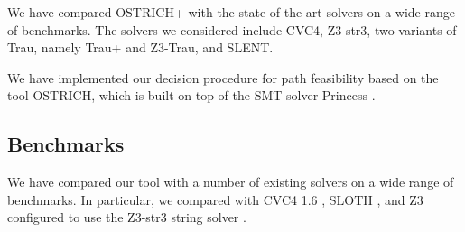 
We have compared OSTRICH+ with the state-of-the-art solvers on a wide range of benchmarks. The solvers we considered include CVC4, Z3-str3, two variants of Trau, namely Trau+ and Z3-Trau, and SLENT. 

We have implemented our decision procedure for path feasibility based on the tool OSTRICH, which is built on top of the SMT solver Princess \cite{}. 
%


\subsection{Benchmarks}
 
We have compared our tool with a number of existing solvers on a wide range of benchmarks. In
particular, we compared  with CVC4 1.6 \cite{}, SLOTH \cite{},
and Z3 configured to use the Z3-str3 string solver \cite{}. 

